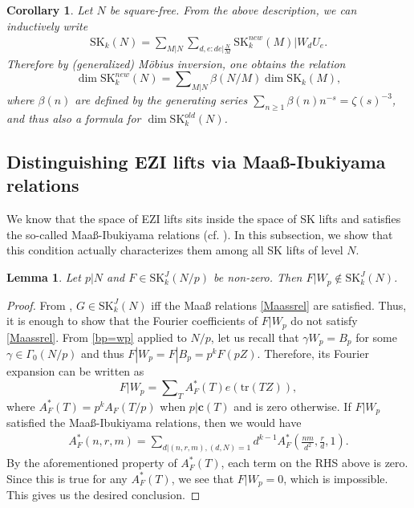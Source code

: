 \documentclass[11pt]{amsart}
\numberwithin{equation}{section}
\theoremstyle{plain}
\newtheorem{lem}[thm]{Lemma}
\newtheorem{cor}[thm]{Corollary}
\theoremstyle{definition}
\newcommand{\mf}{\mathbf}
\newcommand{\mrm}{\mathrm}
\newcommand{\tr}{\mathrm{tr}}
\newcommand{\sumn}{\sum \nolimits}
\newcommand{\skk}{\mrm{SK}_k}
\newcommand{\skkn}{\mrm{SK}_k(N)}
\newcommand{\skkm}{\mrm{SK}_k(M)}
\begin{document}
\begin{cor}
Let $N$ be square-free. From the above description, we can inductively write
\begin{align}
   \skkn = \sumn_{M|N} \sumn_{d,e\colon de|\frac{N}{M}} \skk^{new}(M)|W_d U_e.
\end{align}
Therefore by (generalized) M\"obius inversion, one obtains the relation 
\[ \dim \skk^{new}(N) = \sumn_{M|N} \beta(N/M) \dim \skkm,\]
where $\beta(n)$ are defined by the generating series $\displaystyle \sumn_{n \ge 1} \beta(n)n^{-s} = \zeta(s)^{-3}$, and thus also a formula for $\dim \skk^{old}(N)$.
\end{cor}

\subsection{Distinguishing EZI lifts via Maa{\ss}-Ibukiyama relations}\label{MaassDist}
We know that the space of EZI lifts sits inside the space of SK lifts and satisfies the so-called Maa{\ss}-Ibukiyama relations (cf. \cite[Prop.~3.8]{Ibu-SK}). In this subsection, we show that this condition actually characterizes them among all SK lifts of level $N$.

\begin{lem}\label{lem:Wpnonlift}
    Let $p|N$ and $F\in \mrm{SK}_k^J(N/p)$ be non-zero. Then $F|W_p\not\in \mrm{SK}_k^J(N)$.
\end{lem}
\begin{proof}
    From \cite{heim2017maass}, $G\in \mrm{SK}_k^J(N)$ iff the Maa{\ss} relations \eqref{Maassrel} are satisfied. 
Thus, it is enough to show that the Fourier coefficients of $F|W_p$ do not satisfy \eqref{Maassrel}. From \eqref{bp=wp} applied to $N/p$, let us recall that $\gamma W_p= B_p $ for some $\gamma\in \Gamma_0(N/p)$ and 
thus $F|W_p= F|B_p= p^k F(pZ)$. Therefore, its Fourier expansion can be written as 
 \begin{equation}
     F|W_p = \sumn_{T}A^*_{F}(T)e(\tr(TZ)),
 \end{equation}
where $A^*_{F}(T)= p^k A_{F}(T/p)$ when $p| \mf c(T)$ and is zero otherwise. If $F|W_p$ satisfied the Maa{\ss}-Ibukiyama relations, then we would have
\begin{align}
    A^*_{F}(n,r,m)= \sum_{d|(n,r,m), (d,N)=1} d^{k-1}  A^*_{F}(\frac{nm}{d^2},\frac{r}{d},1).
\end{align}
By the aforementioned property of $A^*_{F}(T)$, each term on the RHS above is zero. Since this is true for any $A^*_{F}(T)$, we see that $F|W_p=0$, which is impossible. This gives us the desired conclusion.
\end{proof}
\end{document}
